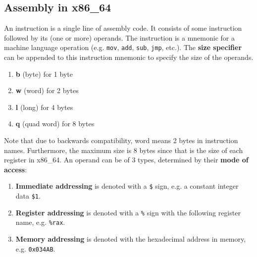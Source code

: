 \documentclass{article}
\begin{document}
  \subsection{Assembly in x86\_64} 

    \begin{definition}[Instruction]
      An instruction is a single line of assembly code. It consists of some instruction followed by its (one or more) operands. The instruction is a mnemonic for a machine language operation (e.g. \texttt{mov}, \texttt{add}, \texttt{sub}, \texttt{jmp}, etc.). The \textbf{size specifier} can be appended to this instruction mnemonic to specify the size of the operands. 
      \begin{enumerate} 
        \item \textbf{b} (byte) for 1 byte 
        \item \textbf{w} (word) for 2 bytes
        \item \textbf{l} (long) for 4 bytes 
        \item \textbf{q} (quad word) for 8 bytes
      \end{enumerate}
      Note that due to backwards compatibility, word means 2 bytes in instruction names. Furthermore, the maximum size is 8 bytes since that is the size of each register in x86\_64. An operand can be of 3 types, determined by their \textbf{mode of access}:
      \begin{enumerate} 
        \item \textbf{Immediate addressing} is denoted with a \texttt{\$} sign, e.g. a constant integer data \texttt{\$1}. 
        \item \textbf{Register addressing} is denoted with a \texttt{\%} sign with the following register name, e.g. \texttt{\%rax}.
        \item \textbf{Memory addressing} is denoted with the hexadecimal address in memory, e.g. \texttt{0x034AB}.
      \end{enumerate}
    \end{definition}
\end{document}
